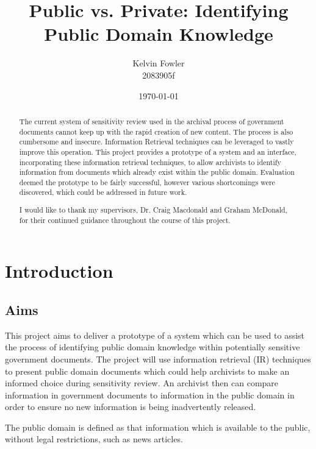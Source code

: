 \documentclass{l4proj}
\title{Public vs. Private: \newline Identifying Public Domain Knowledge}
\author{Kelvin Fowler\\2083905f}
\date{\today}
\begin{document}
\maketitle

\begin{abstract}
The current system of sensitivity review used in the archival process of government documents cannot keep up with the rapid creation of new content. The process is also cumbersome and insecure.
Information Retrieval techniques can be leveraged to vastly improve this operation. This project provides a prototype of a system and an interface, incorporating these information retrieval techniques, to allow archivists to identify information from documents which already exist within the public domain. Evaluation deemed the prototype to be fairly successful, however various shortcomings were discovered, which could be addressed in future work.
\end{abstract}

\renewcommand{\abstractname}{Acknowledgements}
\begin{abstract}
I would like to thank my supervisors, Dr. Craig Macdonald and Graham McDonald, for their continued guidance throughout the course of this project.
\end{abstract}

\educationalconsent
\tableofcontents

\chapter{Introduction}

\section{Aims}
This project aims to deliver a prototype of a system which can be used to assist the process of identifying public domain knowledge within potentially sensitive government documents. The project will use information retrieval (IR) techniques to present public domain documents which could help archivists to make an informed choice during sensitivity review. An archivist then can compare information in government documents to information in the public domain in order to ensure no new information is being inadvertently released.

The public domain is defined as that information which is available to the public, without legal restrictions, such as news articles.
\end{document}
